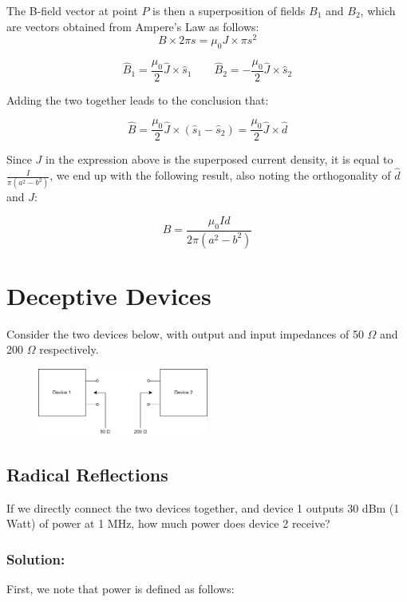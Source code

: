 \documentclass{article}
\begin{document}
\newpage

 The B-field vector at point $P$ is then a superposition of fields $B_1$ and $B_2$, which are vectors obtained from Ampere's Law as follows:
\[
B\times 2\pi s = \mu_0 J \times \pi s^2 
\]

\[
\hat{B}_1 = \frac{\mu_0}{2} \hat{J}\times \hat{s}_1 \qquad \hat{B}_2 = -\frac{\mu_0}{2} \hat{J} \times \hat{s}_2
\]

Adding the two together leads to the conclusion that:

\[
\hat{B} = \frac{\mu_0}{2}\hat{J} \times(\hat{s}_1 - \hat{s}_2) = \frac{\mu_0}{2}\hat{J}\times\hat{d}
\]

Since $J$ in the expression above is the superposed current density, it is equal to $\frac{I}{\pi(a^2 - b^2)}$, we end up with the following result, also noting the orthogonality of $\hat{d}$ and $J$:

\[
B = \frac{\mu_0 I d}{2\pi (a^2 - b^2)}
\]
\newpage

\section{Deceptive Devices}

Consider the two devices below, with output and input impedances of 50 $\Omega$ and 200 $\Omega$ respectively. 

\begin{figure}[H]
\begin{center}
    \includegraphics[width= 0.5\textwidth]{figures/matc.png}
\end{center}
\end{figure}
\subsection{Radical Reflections}
If we directly connect the two devices together, and device 1 outputs 30 dBm (1 Watt) of power at 1 MHz, how much power does device 2 receive?

\subsubsection{Solution:} 

First, we note that power is defined as follows:
\end{document}
